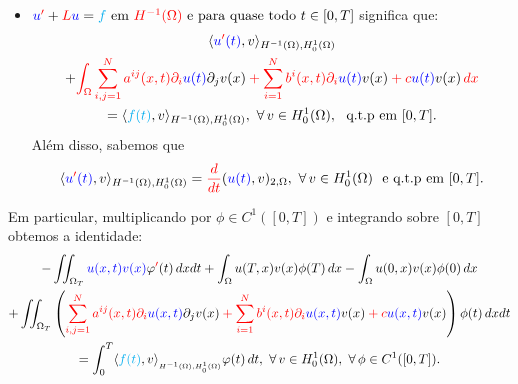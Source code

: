 \begin{frame}
\begin{itemize}

\item \({\color{blue}u}^{{\color{red}\prime}}+{\color{red}L}{\color{blue}u}
={\color{cyan}f} \text{ em } {\color{red}H^{-1}(\Omega)} \text{ e  para quase todo } t\in [0,T]
\) significa que:
\begin{multline*}
\innp{{\color{blue}u^{\color{red}\prime}(t)},{\color{black}v}}_{\hd,\ho}\\
+{\color{red}\int_\Omega \sij a^{ij}(x,t)\partial_i{\color{blue}u(t)}{\color{black}\partial_jv(x)}
+\si b^i(x,t)\partial_i{\color{blue}u(t)}{\color{black}v(x)}
+c{\color{blue}u(t)}{\color{black}v(x)}\,dx}\\
=\innp{{\color{cyan}f(t)},{\color{black}v}}_{\hd,\ho},\ 
\forall\, {\color{black} v}\in \ho,\ \text{ q.t.p em  } [0,T].
\end{multline*}
Além disso, sabemos que
\[
\innp{{\color{blue}u^{\color{red}\prime}(t)},{v}}_{\hd,\ho}
={\color{red}\frac{d}{dt}}({\color{blue}u(t)},{v})_{2,\Omega},\ 
\forall\, {\color{black} v}\in \ho \ \text{ e q.t.p em } [0,T].
\]
\end{itemize}
\end{frame}
\begin{frame}
Em particular, multiplicando por \(\phi\in C^1([0,T])\) e integrando sobre \([0,T]\) 
obtemos a identidade:
\begin{multline*}
-\iint_{\Omega_T}{\color{blue}u(x,t)}{\color{blue}v(x)}\varphi^{\color{red}\prime}(t)\,dxdt
+\int_\Omega u(T,x) v(x)\phi(T)\,dx -\int_\Omega u(0,x) v(x)\phi(0)\,dx 
\\
+\iint_{\Omega_T}\left({\color{red}\sij a^{ij}(x,t)\partial_i{\color{blue}u(x,t)}{\color{black}\partial_jv(x)}
+\si b^i(x,t)\partial_i{\color{blue}u(x,t)}{\color{black}v(x)}
+c{\color{blue}u(x,t)}{\color{black}v(x)}}\right)  \phi(t)\,dxdt\\
=\int_{0}^T\innp{{\color{cyan}f(t)},{\color{black}v}}_{_{\hd,\ho}}\varphi(t)\,dt,\ 
\forall\, {\color{black} v}\in \ho, \ \forall\, \phi\in C^1([0,T]).
\end{multline*}
\end{frame}
